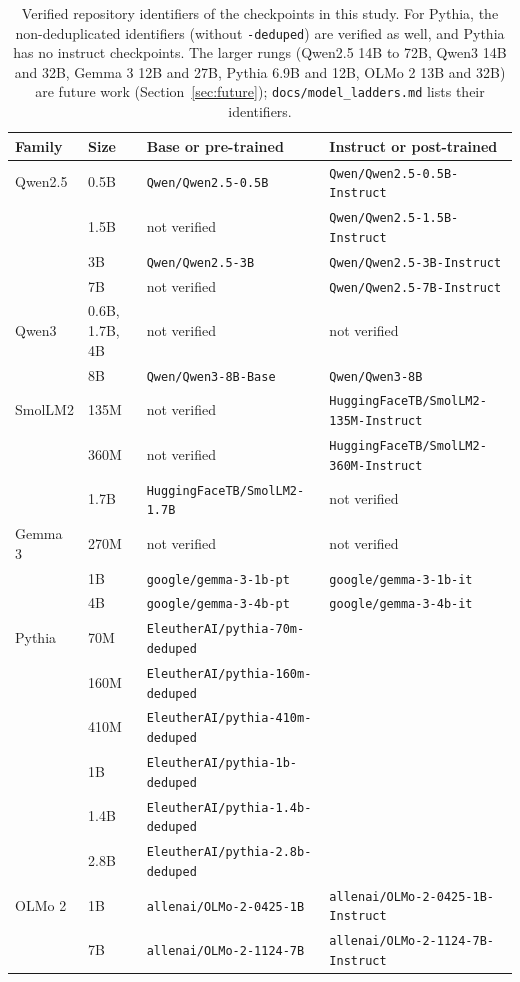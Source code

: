 \begin{table}[h]
\centering\footnotesize
\caption{Verified repository identifiers of the checkpoints in this study. For Pythia, the non-deduplicated identifiers (without \texttt{-deduped}) are verified as well, and Pythia has no instruct checkpoints. The larger rungs (Qwen2.5 14B to 72B, Qwen3 14B and 32B, Gemma 3 12B and 27B, Pythia 6.9B and 12B, OLMo 2 13B and 32B) are future work (Section~\ref{sec:future}); \texttt{docs/model\_ladders.md} lists their identifiers.}
\label{tab:repoids}
\begin{tabularx}{\linewidth}{@{}l l X X@{}}
\toprule
Family & Size & Base or pre-trained & Instruct or post-trained\\
\midrule
Qwen2.5 & 0.5B & \texttt{Qwen/Qwen2.5-0.5B} & \texttt{Qwen/Qwen2.5-0.5B-Instruct}\\
 & 1.5B & not verified & \texttt{Qwen/Qwen2.5-1.5B-Instruct}\\
 & 3B & \texttt{Qwen/Qwen2.5-3B} & \texttt{Qwen/Qwen2.5-3B-Instruct}\\
 & 7B & not verified & \texttt{Qwen/Qwen2.5-7B-Instruct}\\
\midrule
Qwen3 & 0.6B, 1.7B, 4B & not verified & not verified\\
 & 8B & \texttt{Qwen/Qwen3-8B-Base} & \texttt{Qwen/Qwen3-8B}\\
\midrule
SmolLM2 & 135M & not verified & \texttt{HuggingFaceTB/SmolLM2-135M-Instruct}\\
 & 360M & not verified & \texttt{HuggingFaceTB/SmolLM2-360M-Instruct}\\
 & 1.7B & \texttt{HuggingFaceTB/SmolLM2-1.7B} & not verified\\
\midrule
Gemma 3 & 270M & not verified & not verified\\
 & 1B & \texttt{google/gemma-3-1b-pt} & \texttt{google/gemma-3-1b-it}\\
 & 4B & \texttt{google/gemma-3-4b-pt} & \texttt{google/gemma-3-4b-it}\\
\midrule
Pythia & 70M & \texttt{EleutherAI/pythia-70m-deduped} & \\
 & 160M & \texttt{EleutherAI/pythia-160m-deduped} & \\
 & 410M & \texttt{EleutherAI/pythia-410m-deduped} & \\
 & 1B & \texttt{EleutherAI/pythia-1b-deduped} & \\
 & 1.4B & \texttt{EleutherAI/pythia-1.4b-deduped} & \\
 & 2.8B & \texttt{EleutherAI/pythia-2.8b-deduped} & \\
\midrule
OLMo 2 & 1B & \texttt{allenai/OLMo-2-0425-1B} & \texttt{allenai/OLMo-2-0425-1B-Instruct}\\
 & 7B & \texttt{allenai/OLMo-2-1124-7B} & \texttt{allenai/OLMo-2-1124-7B-Instruct}\\
\bottomrule
\end{tabularx}
\end{table}
